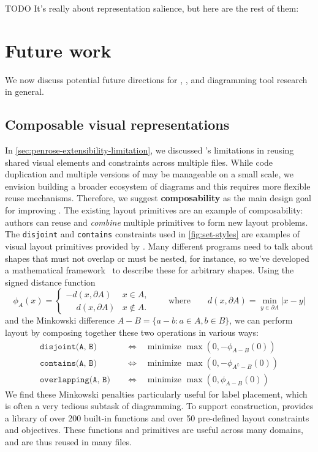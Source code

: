 TODO It's really about representation salience, but here are the rest of them:

\section{Future work}

We now discuss potential future directions for \Penrose, \Edgeworth, and diagramming tool research in general. 

\subsection{Composable visual representations}

In \cref{sec:penrose-extensibility-limitation}, we discussed \Penrose's limitations in reusing shared visual elements and constraints across multiple \Style files. While code duplication and multiple versions of \Style{} may be manageable on a small scale, we envision building a broader ecosystem of diagrams and this requires more flexible reuse mechanisms. Therefore, we suggest \textbf{composability} as the main design goal for improving \Penrose{}. The existing layout primitives are an example of composability: authors can reuse and \emph{combine} multiple primitives to form new layout problems. The \texttt{disjoint} and \texttt{contains} constraints used in \cref{fig:set-styles} are examples of visual layout primitives provided by \Penrose. Many different \Style{} programs need to talk about shapes that must not overlap or must be nested, for instance, so we've developed a mathematical framework~\cite{Minarcik2024Minkowski} to describe these for arbitrary shapes. Using the signed distance function
\setlength{\abovedisplayskip}{5pt} 
\setlength{\belowdisplayskip}{5pt} 
\setlength{\abovedisplayshortskip}{5pt} 
\setlength{\belowdisplayshortskip}{5pt}
\[
    \phi_A(x) = \begin{cases}
        -d(x, \partial A) & x \in A, \\
        \phantom{-}d(x, \partial A) & x \notin A.
    \end{cases}
    \qquad\text{where}\qquad
    d(x, \partial A) = \min_{y \in \partial A} |x-y|
\]
and the Minkowski difference $A - B = \{ a - b \colon a \in A, b \in B \}$, we can perform layout by composing together these two operations in various ways:
\begin{align*}
    \texttt{disjoint(A, B)} &\quad\iff\quad \text{minimize }\max(0, -\phi_{A - B}(0)) \\
    \texttt{contains(A, B)} &\quad\iff\quad \text{minimize }\max(0, -\phi_{A^\complement - B}(0)) \\
    \texttt{overlapping(A, B)} &\quad\iff\quad \text{minimize }\max(0, \phi_{A - B}(0))
\end{align*}
We find these Minkowski penalties particularly useful for label placement, which is often a very tedious subtask of diagramming.
To support \Style{} construction, \Penrose{} provides a library of over 200 built-in functions and over 50 pre-defined layout constraints and objectives. These functions and primitives are useful across many domains, and are thus reused in many \Style{} files.

